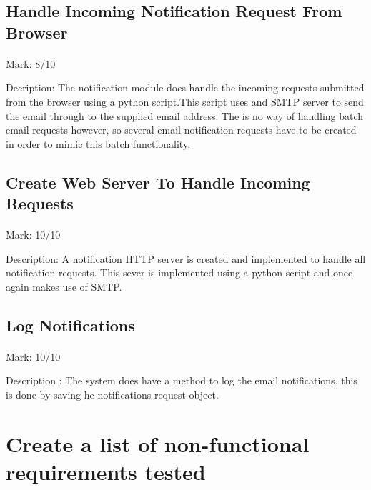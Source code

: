 \documentclass[11pt]{article}
\begin{document}
	\subsection{Handle Incoming Notification Request From Browser}
		\paragraph{} Mark: 8/10
		\noindent
		\begin{center}
			Decription: The notification module does handle the incoming requests submitted from the browser using a python script.This script uses and SMTP server to send the email through to the supplied email address. The is no way of handling batch email requests however, so several email notification requests have to be created in order to mimic this batch functionality.
		\end{center}

	\subsection{Create Web Server To Handle Incoming Requests} 
		\paragraph{} Mark: 10/10
		\noindent
		\begin{center}
			Description: A notification HTTP server is created and implemented to handle all notification requests. This sever is implemented using a python script and once again makes use of SMTP.
		\end{center}

	\subsection{Log Notifications} 
		\paragraph{} Mark: 10/10
		\noindent
		\begin{center}
			Description : The system does have a method to log the email notifications, this is done by saving he notifications request object.
		\end{center}


\section{Create a list of non-functional requirements tested}
\end{document}
